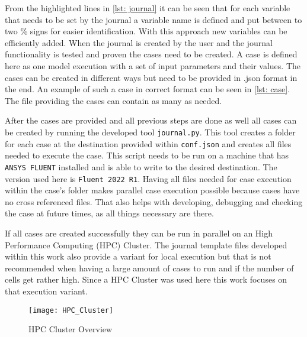 \documentclass[../thesis.tex]{subfiles}
\begin{document}
From the highlighted lines in \autoref{lst: journal} it can be seen that for each variable that needs to be set by the journal a variable name is defined and put between to two \% signs for easier identification. With this approach new variables can be efficiently added. When the journal is created by the user and the journal functionality is tested and proven the cases need to be created. A case is defined here as one model execution with a set of input parameters and their values. The cases can be created in different ways but need to be provided in .json format in the end. An example of such a case in correct format can be seen in \autoref{lst: case}. The file providing the cases can contain as many as needed. 



After the cases are provided and all previous steps are done as well all cases can be created by running the developed tool \texttt{journal.py}.
This tool creates a folder for each case at the destination provided within \texttt{conf.json} and creates all files needed to execute the case. This script needs to be run on a machine that has \texttt{ANSYS FLUENT} installed and is able to write to the desired destination. The version used here is \texttt{Fluent 2022 R1}. Having all files needed for case execution within the case's folder makes parallel case execution possible because cases have no cross referenced files. That also helps with developing, debugging and checking the case at future times, as all things necessary are there.

If all cases are created successfully they can be run in parallel on an High Performance Computing (HPC) Cluster. The journal template files developed within this work also provide a variant for local execution but that is not recommended when having a large amount of cases to run and if the number of cells get rather high. Since a HPC Cluster was used here this work focuses on that execution variant.

\begin{figure}[htbp]
	\centering
	\texttt{[image: HPC\_Cluster]}
	\caption{HPC Cluster Overview}
	\label{fig: HPC_Cluster}
\end{figure}
\end{document}
